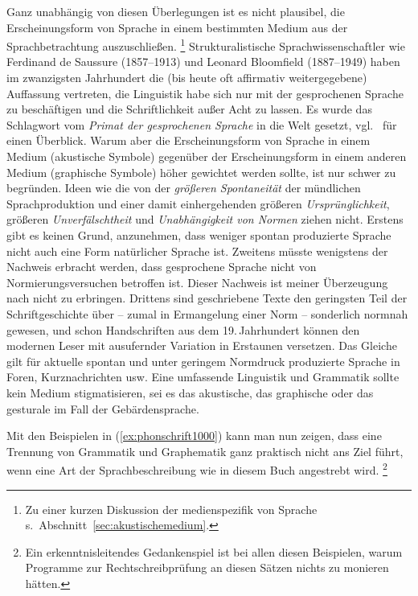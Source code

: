 Ganz unabhängig von diesen Überlegungen ist es nicht plausibel, die Erscheinungsform von Sprache in einem bestimmten Medium aus der Sprachbetrachtung auszuschließen.%
\footnote{Zu einer kurzen Diskussion der medienspezifik von Sprache s.\ Abschnitt~\ref{sec:akustischemedium}.}
Strukturalistische Sprachwissenschaftler wie Ferdinand de Saussure (1857--1913) und Leonard Bloomfield (1887--1949) haben im zwanzigsten Jahrhundert die (bis heute oft affirmativ weitergegebene) Auffassung vertreten, die Linguistik habe sich nur mit der gesprochenen Sprache zu beschäftigen und die Schriftlichkeit außer Acht zu lassen.
Es wurde das Schlagwort vom \textit{Primat der gesprochenen Sprache} in die Welt gesetzt, vgl.\ \cite[Kapitel~0]{Duerscheid2012} für einen Überblick.
Warum aber die Erscheinungsform von Sprache in einem Medium (akustische Symbole) gegenüber der Erscheinungsform in einem anderen Medium (graphische Symbole) höher gewichtet werden sollte, ist nur schwer zu begründen.
Ideen wie die von der \textit{größeren Spontaneität} der mündlichen Sprachproduktion und einer damit einhergehenden größeren \textit{Ursprünglichkeit}, größeren \textit{Unverfälschtheit} und \textit{Unabhängigkeit von Normen} ziehen nicht.
Erstens gibt es keinen Grund, anzunehmen, dass weniger spontan produzierte Sprache nicht auch eine Form natürlicher Sprache ist.
Zweitens müsste wenigstens der Nachweis erbracht werden, dass gesprochene Sprache nicht von Normierungsversuchen betroffen ist.
Dieser Nachweis ist meiner Überzeugung nach nicht zu erbringen.
Drittens sind geschriebene Texte den geringsten Teil der Schriftgeschichte über -- zumal in Ermangelung einer Norm -- sonderlich normnah gewesen, und schon Handschriften aus dem 19.\,Jahrhundert können den modernen Leser mit ausufernder Variation in Erstaunen versetzen.
Das Gleiche gilt für aktuelle spontan und unter geringem Normdruck produzierte Sprache in Foren, Kurznachrichten usw.
Eine umfassende Linguistik und Grammatik sollte kein Medium stigmatisieren, sei es das akustische, das graphische oder \zB das gesturale im Fall der Gebärdensprache.

Mit den Beispielen in (\ref{ex:phonschrift1000}) kann man nun zeigen, dass eine Trennung von Grammatik und Graphematik ganz praktisch nicht ans Ziel führt, wenn eine Art der Sprachbeschreibung wie in diesem Buch angestrebt wird.%
\footnote{Ein erkenntnisleitendes Gedankenspiel ist bei allen diesen Beispielen, warum Programme zur Rechtschreibprüfung an diesen Sätzen nichts zu monieren hätten.}

\begin{exe}
  \ex\label{ex:phonschrift1000} 
  \begin{xlist}
  \end{xlist}
\end{exe}

